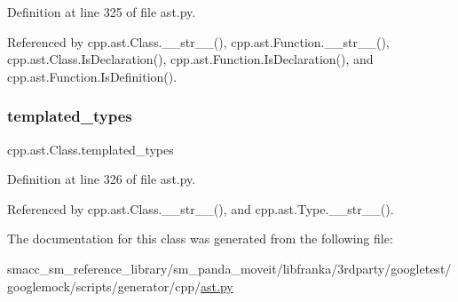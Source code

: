 Definition at line 325 of file ast.\+py.



Referenced by cpp.\+ast.\+Class.\+\_\+\+\_\+str\+\_\+\+\_\+(), cpp.\+ast.\+Function.\+\_\+\+\_\+str\+\_\+\+\_\+(), cpp.\+ast.\+Class.\+Is\+Declaration(), cpp.\+ast.\+Function.\+Is\+Declaration(), and cpp.\+ast.\+Function.\+Is\+Definition().

\mbox{\label{classcpp_1_1ast_1_1Class_a48ed0d3115656554d9134bc1787390fa}} 
\subsubsection{\texorpdfstring{templated\+\_\+types}{templated\_types}}
{\footnotesize\ttfamily cpp.\+ast.\+Class.\+templated\+\_\+types}



Definition at line 326 of file ast.\+py.



Referenced by cpp.\+ast.\+Class.\+\_\+\+\_\+str\+\_\+\+\_\+(), and cpp.\+ast.\+Type.\+\_\+\+\_\+str\+\_\+\+\_\+().



The documentation for this class was generated from the following file\+:\begin{DoxyCompactItemize}
\item 
smacc\+\_\+sm\+\_\+reference\+\_\+library/sm\+\_\+panda\+\_\+moveit/libfranka/3rdparty/googletest/googlemock/scripts/generator/cpp/\hyperlink{ast_8py}{ast.\+py}\end{DoxyCompactItemize}
